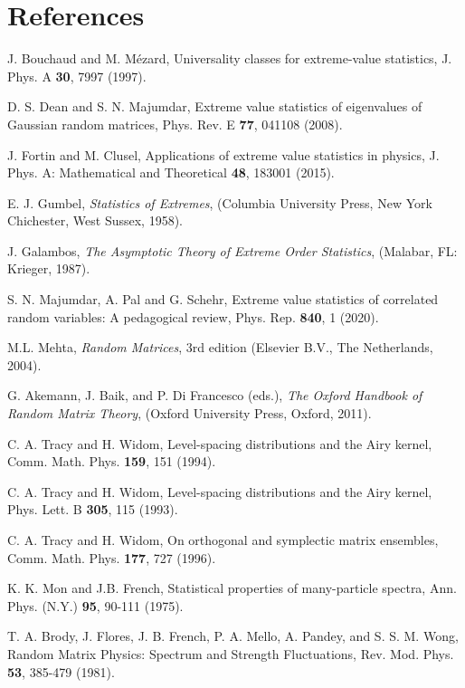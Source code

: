 \section*{References}

\begin{thebibliography}{99}

 J. Bouchaud and M. M{\'e}zard,  Universality classes for extreme-value statistics,  J.  Phys.  A {\bf 30}, 7997 (1997). 

 D. S. Dean and S. N. Majumdar, Extreme value statistics of eigenvalues of Gaussian random matrices, Phys. Rev. E {\bf 77}, 041108 (2008).

 J.  Fortin and M. Clusel,  Applications of extreme value statistics in physics,  J.  Phys.  A: Mathematical and Theoretical {\bf 48}, 183001 (2015). 

 E. J. Gumbel,  {\it Statistics of Extremes}, (Columbia University Press,  New York Chichester, West Sussex, 1958).

 J.  Galambos,  {\it The Asymptotic Theory of Extreme Order Statistics},  (Malabar, FL: Krieger, 1987).

 S. N. Majumdar,  A. Pal and G. Schehr, Extreme value statistics of correlated random variables: A pedagogical review, Phys. Rep. {\bf 840}, 1 (2020).

 M.L. Mehta, {\it Random Matrices}, 3rd edition (Elsevier B.V., The Netherlands, 2004).

 G. Akemann, J. Baik, and P. Di Francesco (eds.), {\it The Oxford Handbook of Random Matrix Theory},  (Oxford University Press, Oxford, 2011).

 C. A. Tracy and H. Widom, Level-spacing distributions and the Airy kernel, Comm. Math. Phys. {\bf 159},  151 (1994).

 C. A. Tracy and H. Widom, Level-spacing distributions and the Airy kernel,  Phys. Lett. B {\bf 305},  115 (1993).

 C. A. Tracy and H. Widom, On orthogonal and symplectic matrix ensembles,  Comm. Math. Phys. {\bf 177},  727 (1996).

 K. K. Mon and J.B. French, Statistical properties of many-particle spectra, Ann. Phys. (N.Y.) {\bf 95}, 90-111 (1975).

 T. A. Brody, J. Flores, J. B. French, P. A. Mello, A. Pandey, and S. S. M. Wong, Random Matrix Physics: Spectrum and Strength Fluctuations, Rev. Mod. Phys. {\bf 53}, 385-479 (1981).


\end{thebibliography}
